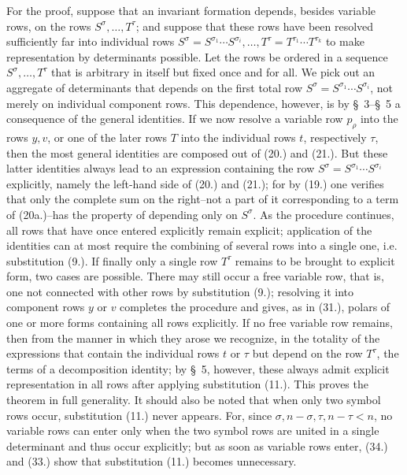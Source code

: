 \documentclass[11pt]{article}
\begin{document}
For the proof, suppose that an invariant formation depends, besides variable rows, on the rows $S^\sigma,\ldots,T^\tau$; and suppose that these rows have been resolved sufficiently far into individual rows $S^\sigma=S^{\sigma_1}\cdots S^{\sigma_i},\ldots,T^\tau=T^{\tau_1}\cdots T^{\tau_k}$ to make representation by determinants possible. Let the rows be ordered in a sequence $S^\sigma,\ldots,T^\tau$ that is arbitrary in itself but fixed once and for all. We pick out an aggregate of determinants that depends on the first total row $S^\sigma=S^{\sigma_1}\cdots S^{\sigma_i}$, not merely on individual component rows. This dependence, however, is by \S\ 3--\S\ 5 a consequence of the general identities. If we now resolve a variable row $p_\rho$ into the rows $y,v$, or one of the later rows $T$ into the individual rows $t$, respectively $\tau$, then the most general identities are composed out of (20.) and (21.). But these latter identities always lead to an expression containing the row $S^\sigma=S^{\sigma_1}\cdots S^{\sigma_i}$ explicitly, namely the left-hand side of (20.) and (21.); for by (19.) one verifies that only the complete sum on the right--not a part of it corresponding to a term of (20a.)--has the property of depending only on $S^\sigma$. As the procedure continues, all rows that have once entered explicitly remain explicit; application of the identities can at most require the combining of several rows into a single one, i.e. substitution (9.). If finally only a single row $T^\tau$ remains to be brought to explicit form, two cases are possible. There may still occur a free variable row, that is, one not connected with other rows by substitution (9.); resolving it into component rows $y$ or $v$ completes the procedure and gives, as in (31.), polars of one or more forms containing all rows explicitly. If no free variable row remains, then from the manner in which they arose we recognize, in the totality of the expressions that contain the individual rows $t$ or $\tau$ but depend on the row $T^\tau$, the terms of a decomposition identity; by \S\ 5, however, these always admit explicit representation in all rows after applying substitution (11.). This proves the theorem in full generality. It should also be noted that when only two symbol rows occur, substitution (11.) never appears. For, since $\sigma,n-\sigma,\tau,n-\tau<n$, no variable rows can enter only when the two symbol rows are united in a single determinant and thus occur explicitly; but as soon as variable rows enter, (34.) and (33.) show that substitution (11.) becomes unnecessary.
\end{document}
